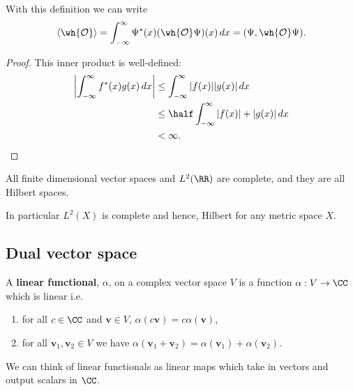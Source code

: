 \documentclass[12pt, a4paper]{article}
\begin{document}
\begin{mdremark}
    With this definition we can write 
    \[\langle \wh{\mathcal{O}} \rangle = \int_{-\infty}^{\infty} \Psi^*(x) (\wh{\mathcal{O}}\Psi)(x) \, dx = (\Psi,\wh{\mathcal{O}}\Psi).\]
\end{mdremark}

\begin{proof}
    This inner product is well-defined:
    \[\begin{aligned}
        \abs{\int_{-\infty}^{\infty} f^*(x) g(x) \, dx} &\leq \int_{-\infty}^{\infty} \abs{f(x)} \abs{g(x)} \, dx \\
        &\leq \half \int_{-\infty}^{\infty} \abs{f(x)}+\abs{g(x)} \, dx \\
        &<\infty.
    \end{aligned}\]
\end{proof}

\begin{mdthm}
    All finite dimensional vector spaces and \(L^2(\RR)\) are complete, and they are all Hilbert spaces.
\end{mdthm}

\begin{mdremark}
    In particular \(L^2(X)\) is complete and hence, Hilbert for any metric space \(X\).
\end{mdremark}

\subsection{Dual vector space}

\begin{definition}
    A \textbf{linear functional}, \(\alpha\), on a complex vector space \(V\) is a function \(\alpha: V \to \CC\) which is linear i.e.
    \begin{enumerate}
        \item for all \(c \in \CC\) and \(\bm{v} \in V\), \(\alpha(c\bm{v}) = c\alpha(\bm{v})\),
        \item for all \(\bm{v}_1,\bm{v}_2 \in V\) we have \(\alpha(\bm{v}_1+\bm{v}_2) = \alpha(\bm{v}_1)+\alpha(\bm{v}_2)\).
    \end{enumerate}
\end{definition}

\begin{mdnote}
    We can think of linear functionals as linear maps which take in vectors and output scalars in \(\CC\).
\end{mdnote}
\end{document}
